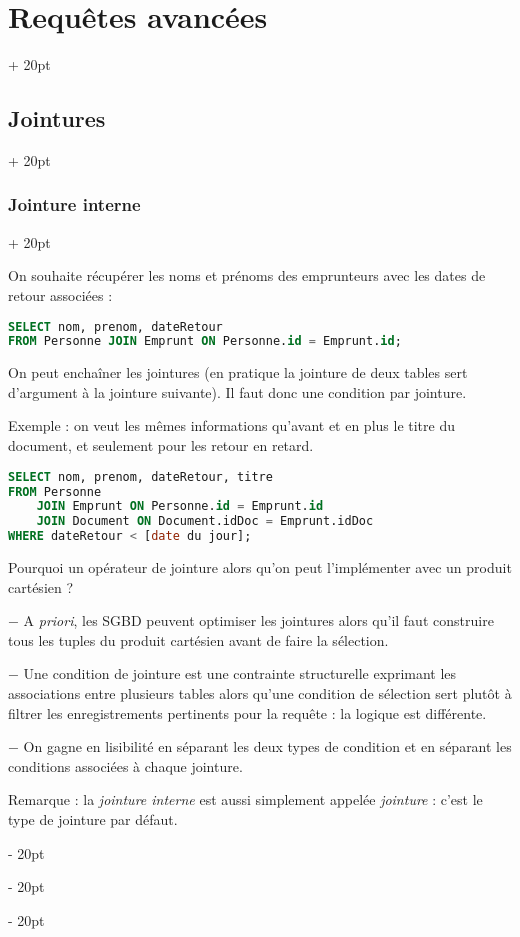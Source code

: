 \documentclass[a4paper, 12pt, twoside]{article}
\newcommand{\ind}[1][20pt]{\advance\leftskip + #1}
\newcommand{\deind}[1][20pt]{\advance\leftskip - #1}
\newenvironment{indt}[2][20pt]{#2 \par \ind[#1]}{\par \deind} %
\begin{document}
\begin{indt}{\section{Requêtes avancées}}
\begin{indt}{\subsection{Jointures}}
\begin{indt}{\subsubsection{Jointure interne}}
                \vspace{12pt}
                
                On souhaite récupérer les noms et prénoms des emprunteurs avec les dates de retour associées :

                \begin{lstlisting}[language=SQL, xleftmargin=80pt]
SELECT nom, prenom, dateRetour
FROM Personne JOIN Emprunt ON Personne.id = Emprunt.id;\end{lstlisting}
                
                On peut enchaîner les jointures (en pratique la jointure de deux tables sert d'argument à la jointure suivante). Il faut donc une condition par jointure.

                Exemple : on veut les mêmes informations qu'avant et en plus le titre du document, et seulement pour les retour en retard.

                \begin{lstlisting}[language=SQL, xleftmargin=80pt]
SELECT nom, prenom, dateRetour, titre
FROM Personne
    JOIN Emprunt ON Personne.id = Emprunt.id
    JOIN Document ON Document.idDoc = Emprunt.idDoc
WHERE dateRetour < [date du jour];\end{lstlisting}

                \vspace{6pt}
                
                Pourquoi un opérateur de jointure alors qu'on peut l'implémenter avec un produit cartésien ?

                \vspace{6pt}
                
                $-$ A \textit{priori}, les SGBD peuvent optimiser les jointures alors qu'il faut construire tous les tuples du produit cartésien avant de faire la sélection.

                $-$ Une condition de jointure est une contrainte structurelle exprimant les associations entre plusieurs tables alors qu'une condition de sélection sert plutôt à filtrer les enregistrements pertinents pour la requête : la logique est différente.

                $-$ On gagne en lisibilité en séparant les deux types de condition et en séparant les conditions associées à chaque jointure.

                \vspace{12pt}
                
                Remarque : la \textit{jointure interne} est aussi simplement appelée \textit{jointure} : c'est le type de jointure par défaut.
            \end{indt}


\end{indt}
\end{indt}
\end{document}
